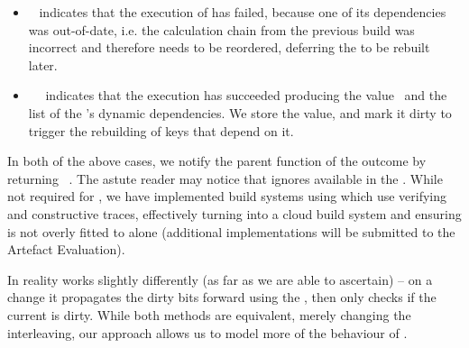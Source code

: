 \begin{itemize}
    \item {}~ indicates that the execution of  has
    failed, because one of its dependencies  was out-of-date, i.e. the
    calculation chain from the previous build was incorrect and therefore needs
    to be reordered, deferring the  to be rebuilt later.
    \item {}~~ indicates that the
    execution has succeeded producing the value~ and the list of the
    's dynamic dependencies. We store the value, and mark it dirty to
    trigger the rebuilding of keys that depend on it.
\end{itemize}

In both of the above cases, we notify the parent  function of
the outcome by returning ~. The astute reader may notice
that  ignores  available in the .
While not required for \Excel, we have implemented build systems using
 which use verifying and constructive traces, effectively turning
\Excel into a cloud build system and ensuring  is not overly
fitted to \Excel alone (additional implementations will be submitted to the
Artefact Evaluation).

In reality \Excel works slightly differently (as far as we are able to ascertain) --
on a change it propagates the dirty bits forward using the , then only checks if the current  is dirty. While both methods are equivalent, merely changing the interleaving, our approach allows us to model more of the behaviour of \Excel.

\subsection{\Shake}\label{sec-implementation-shake}

